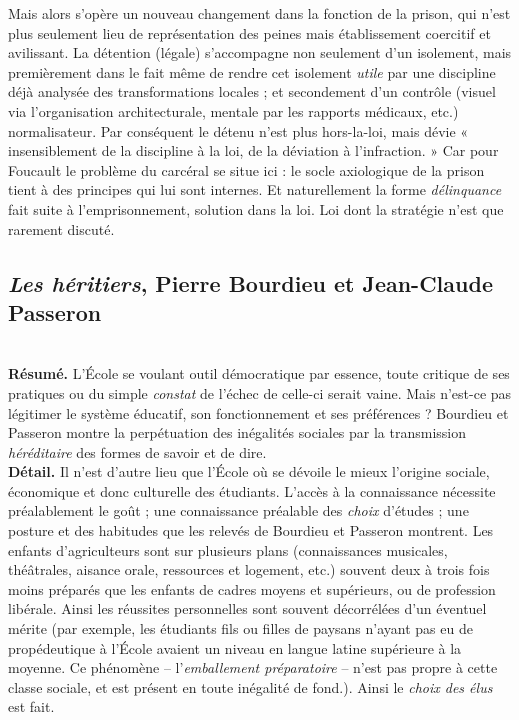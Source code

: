 \documentclass[11pt]{amsart}
\begin{document}
Mais alors s'opère un nouveau changement dans la fonction de la prison, qui n'est plus seulement lieu de représentation des peines mais établissement coercitif et avilissant. La détention (légale) s'accompagne non seulement d'un isolement, mais premièrement dans le fait même de rendre cet isolement \textit{utile} par une discipline déjà analysée des transformations locales ; et secondement d'un contrôle (visuel via l'organisation architecturale, mentale par les rapports médicaux, etc.) normalisateur. Par conséquent le détenu n'est plus hors-la-loi, mais dévie « insensiblement de la discipline à la loi, de la déviation à l'infraction. » Car pour Foucault le problème du carcéral se situe ici : le socle axiologique de la prison tient à des principes qui lui sont internes. Et naturellement la forme \textit{délinquance} fait suite à l'emprisonnement, solution dans la loi. Loi dont la stratégie n'est que rarement discuté.
\newpage

\subsection*{\textsl{Les héritiers}, Pierre Bourdieu et Jean-Claude Passeron}$ $\\

\textbf{Résumé.} L’École se voulant outil démocratique par essence, toute critique de ses pratiques ou du simple \textit{constat} de l'échec de celle-ci serait vaine. Mais n'est-ce pas légitimer le système éducatif, son fonctionnement et ses préférences ? Bourdieu et Passeron montre la perpétuation des inégalités sociales par la transmission \textit{héréditaire} des formes de savoir et de dire.\\

\textbf{Détail.} Il n'est d'autre lieu que l’École où se dévoile le mieux l'origine sociale, économique et donc culturelle des étudiants. L'accès à la connaissance nécessite préalablement le goût ; une connaissance préalable des \textit{choix} d'études ; une posture et des habitudes que les relevés de Bourdieu et Passeron montrent. Les enfants d'agriculteurs sont sur plusieurs plans (connaissances musicales, théâtrales, aisance orale, ressources et logement, etc.) souvent deux à trois fois moins préparés que les enfants de cadres moyens et supérieurs, ou de profession libérale. Ainsi les réussites personnelles sont souvent décorrélées d'un éventuel mérite (par exemple, les étudiants fils ou filles de paysans n'ayant pas eu de propédeutique à l’École avaient un niveau en langue latine supérieure à la moyenne. Ce phénomène – l'\textit{emballement préparatoire} – n'est pas propre à cette classe sociale, et est présent en toute inégalité de fond.). Ainsi le \textsl{choix des élus} est fait.
\end{document}
